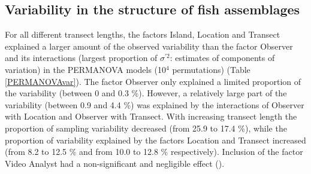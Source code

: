 \documentclass[10pt,letterpaper]{article}
\begin{document}
\subsection{Variability in the structure of fish assemblages}
\label{Variabilityinthestructureoffishassemblages}

For all different transect lengths, the factors Island, Location and Transect explained a larger amount of the observed variability than the factor Observer and its interactions (largest proportion of $\sigma^{'2}$: estimates of components of variation) in the PERMANOVA models (10$^{4}$ permutations) (Table \ref{PERMANOVAvar}). The factor Observer only explained a limited proportion of the variability (between 0 and 0.3 \%). However, a relatively large part of the variability (between 0.9 and 4.4 \%) was explained by the interactions of Observer with Location and Observer with Transect. With increasing transect length the proportion of sampling variability decreased (from 25.9 to 17.4 \%), while the proportion of variability explained by the factors Location and Transect increased (from 8.2 to 12.5 \% and from 10.0 to 12.8 \% respectively). 
Inclusion of the factor Video Analyst had a non-significant and negligible effect 
(). 
\end{document}

